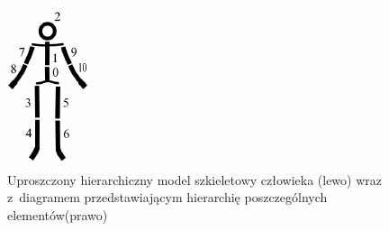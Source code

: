 \begin{figure}[!htb]
	\centering
	\begin{minipage}{.2\textwidth}
		\centering
		\includegraphics[width=\linewidth]{images/hierarchical-structure.png}       
	\end{minipage}%
	\begin{minipage}{0.8\textwidth}
		\centering
		\scalebox{0.8}{
			
		}
	\end{minipage}
	\caption{Uproszczony hierarchiczny model szkieletowy człowieka (lewo) wraz z~diagramem przedstawiającym hierarchię poszczególnych elementów(prawo)\cite{Kwolek2014}}
	\label{fig:literature:skeletonModelHierarchy}
\end{figure}

